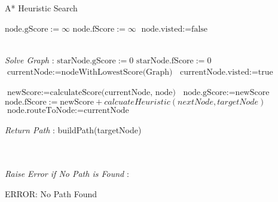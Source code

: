\label{A*}
\begin{algorithm}
  \caption{A* Heuristic Search}
  \begin{algorithmic}[1]
    \STATE $\text{node.gScore} := \infty$
    \STATE $\text{node.fScore} := \infty$
    \STATE $\text{node.visted} := \text{false}$
   \ENDFOR

   \\ \textit{Solve Graph} :
   \STATE $\text{starNode.gScore} := 0$
   \STATE $\text{starNode.fScore} := 0$
  \STATE $\text{currentNode} := \text{nodeWithLowestScore(Graph)}$
  \STATE $\text{currentNode.visted} := \text{true}$

    \STATE $\text{newScore} := \text{calculateScore(currentNode, node)}$
    \STATE  $\text{node.gScore} := \text{newScore}$
    \STATE  $\text{node.fScore} := \text{newScore} + calcuateHeuristic(nextNode, targetNode)$
    \STATE  $\text{node.routeToNode} := \text{currentNode}$
    \ENDIF
    \ENDIF
    \ENDFOR
    \\
    \\ \textit{Return Path} :
    \RETURN build{Path(targetNode)}
    \ENDIF

    \\
    \\ \textit{Raise Error if No Path is Found} :

    \RETURN ERROR: No Path Found
    \ENDIF

   \ENDWHILE

  \end{algorithmic} 
  \end{algorithm}